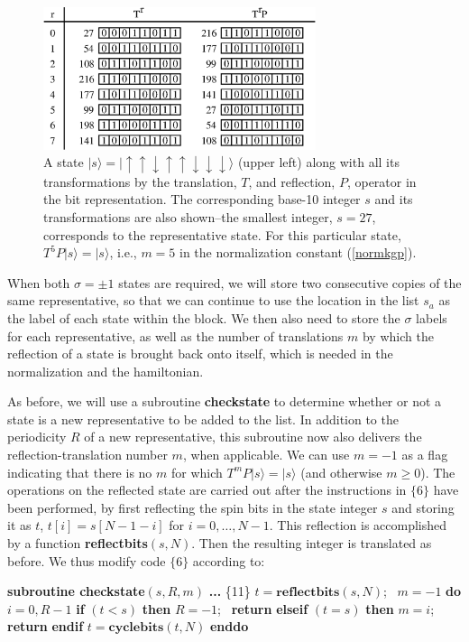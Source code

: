\documentclass[draft,numberedheadings]{aipproc}
\newcommand{\dn}{\downarrow}
\newcommand{\up}{\uparrow}
\newcommand{\code}{\null\vskip-2mm\noindent}
\newcommand{\br}{\hfill\break}
\newcommand{\cia}{\null\hskip5mm}
\newcommand{\cib}{\null\hskip10mm}
\newcommand{\cic}{\null\hskip15mm}
\begin{document}
\begin{figure}
\includegraphics[width=8cm, clip]{bitstates3.eps}
\caption{A state $|s\rangle = |\up\up\dn\up\up\dn\dn\dn\rangle$ (upper left) along with all its transformations by the translation, $T$, and reflection, $P$, operator 
in the bit representation. The corresponding base-10 integer $s$ and its transformations are also shown--the smallest integer, $s=27$, corresponds to the 
representative state. For this particular state, $T^5P|s\rangle=|s\rangle$, i.e., $m=5$ in the normalization 
constant (\ref{normkgp}).}
\label{bitstates3}
\end{figure}

When both $\sigma=\pm 1$ states are required, we will store two consecutive copies of the same representative, so that we can continue to use the location 
in the list $s_a$ as the label of each state within the block. We then also need to store the $\sigma$ labels for each representative, as well as the number 
of translations $m$ by which the reflection of a state is brought back onto itself, which is needed in the 
normalization and the hamiltonian.

As before, we will use a subroutine {\bf checkstate} to determine whether or not a state is a new representative to be added to the list. In addition to the 
periodicity $R$ of a new representative, this subroutine now also delivers the reflection-translation number $m$, when applicable. We can use $m=-1$ as a flag 
indicating that there is no $m$ for which $T^mP|s\rangle = |s\rangle$ (and otherwise $m\ge 0$). The operations on the reflected state are carried out after the 
instructions in $\{6\}$ have been performed, by first reflecting the spin bits in the state integer $s$ and storing it as $t$, $t[i]=s[N-1-i]$ for $i=0,\ldots,N-1$. 
This reflection is accomplished by a function {\bf reflectbits}$(s,N)$. Then the resulting integer is translated as before. We thus modify code $\{6\}$ 
according to:

{\code
\cia       {\bf subroutine checkstate}$(s,R,m)$ \br
\cia       {\bf ...}                                                 \hfill \{11\}\break
\cia       $t=\mathbf{reflectbits}(s,N)$;~ $m=-1$ \br
\cia       {\bf do} $i=0,R-1$ \br
\cib          {\bf if} $(t<s)$ {\bf then} \br
\cic             $R=-1$;~ {\bf return} \br
\cib          {\bf elseif} $(t=s)$ {\bf then} \br
\cic             $m=i$;~ {\bf return} \br        
\cib          {\bf endif} \br
\cib          $t=\mathbf{cyclebits}(t,N)$ \br 
\cia       {\bf enddo} 
\code}
\end{document}
